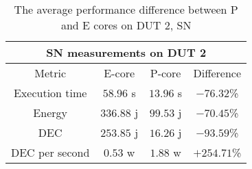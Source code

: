 \begin{table}[H]
    \centering
    \begin{tabular}{|| c | c | c | c ||}
    \hline
    \multicolumn{4}{||c||}{SN measurements on DUT 2} \\ [0.5ex] \hline\hline
    Metric & E-core & P-core & Difference \\\hline
    Execution time & $58.96$ s & $13.96$ s & $-76.32$\% \\
    Energy & $336.88$ j & $99.53$ j & $-70.45$\% \\
    DEC & $253.85$ j & $16.26$ j & $-93.59$\% \\
    DEC per second & $0.53$ w & $1.88$ w & $+254.71$\% \\\hline
    \end{tabular}
    \caption{The average performance difference between P and E cores on DUT 2, SN}
    \label{tab:dut-2-exp-3-sn}
\end{table}












